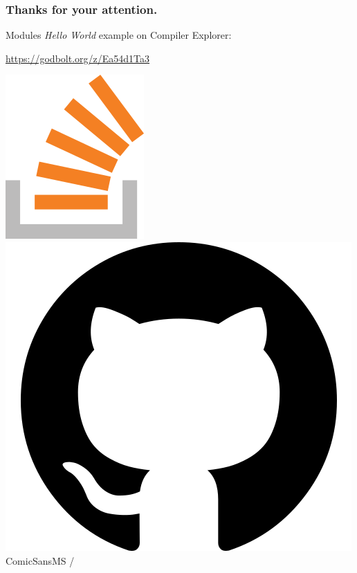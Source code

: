 \documentclass[aspectratio=169]{beamer}
\begin{document}

\begin{frame}
  \frametitle{Thanks for your attention.}

  Modules \emph{Hello World} example on Compiler Explorer:

  \href{https://godbolt.org/z/Ea54d1Ta3}{https://godbolt.org/z/Ea54d1Ta3}
  \vspace{3em}

    \href{https://stackoverflow.com/users/577603/comicsansms}{\includegraphics[height=.05\textheight]{resources/so-icon.png}}
  \href{https://github.com/ComicSansMS}{\includegraphics[height=.05\textheight]{resources/github-icon.png}}
  ComicSansMS /

\end{frame}
\end{document}
